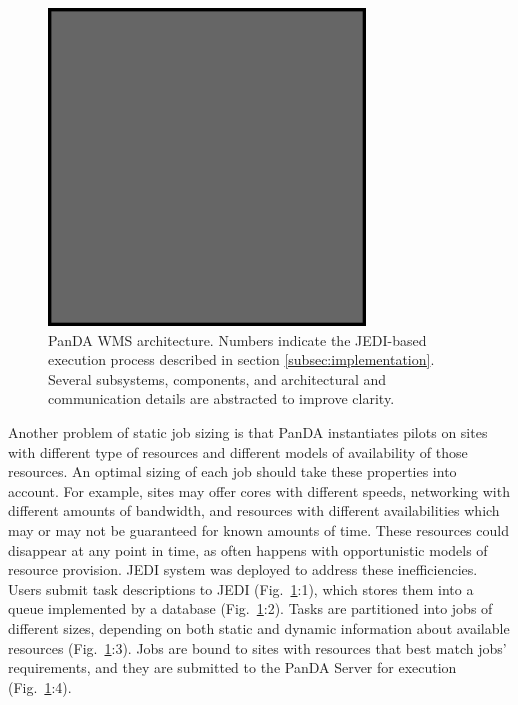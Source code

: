 \begin{figure}
  \includegraphics[width=0.75\textwidth]{images/example.eps}
\caption{PanDA WMS architecture. Numbers indicate the JEDI-based execution
process described in section \ref{subsec:implementation}. Several subsystems,
components, and architectural and communication details are abstracted to
improve clarity.}
\label{fig:architecture}
\end{figure}


Another problem of static job sizing is that PanDA instantiates pilots on sites
with different type of resources and different models of availability of those
resources. An optimal sizing of each job should take these properties into
account. For example, sites may offer cores with different speeds, networking
with different amounts of bandwidth, and resources with different
availabilities which may or may not be guaranteed for known amounts of time.
These resources could disappear at any point in time, as often happens with
opportunistic models of resource provision. JEDI system was deployed to address
these inefficiencies. Users submit task descriptions to JEDI
(Fig.~\ref{fig:architecture}:1), which stores them into a queue implemented by
a database (Fig.~\ref{fig:architecture}:2). Tasks are partitioned into jobs of
different sizes, depending on both static and dynamic information about
available resources (Fig.~\ref{fig:architecture}:3). Jobs are bound to sites
with resources that best match jobs' requirements, and they are submitted to
the PanDA Server for execution (Fig.~\ref{fig:architecture}:4).

